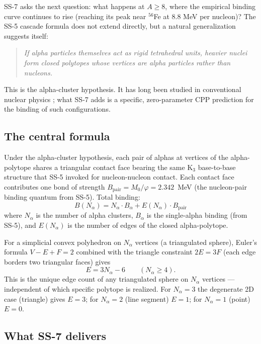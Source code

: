 \documentclass[11pt,letterpaper]{article}
\newcommand{\phig}{\varphi}
\newcommand{\Mzero}{M_0}
\newcommand{\Bpair}{B_{\mathrm{pair}}}
\newcommand{\Balpha}{B_{\alpha}}
\newcommand{\Nalpha}{N_{\alpha}}
\begin{document}
SS-7 asks the next question: what happens at $A \geq 8$, where the empirical binding curve continues to rise (reaching its peak near ${}^{56}$Fe at 8.8 MeV per nucleon)? The SS-5 cascade formula does not extend directly, but a natural generalization suggests itself:

\begin{quote}
\emph{If alpha particles themselves act as rigid tetrahedral units, heavier nuclei form closed polytopes whose vertices are alpha particles rather than nucleons.}
\end{quote}

This is the alpha-cluster hypothesis. It has long been studied in conventional nuclear physics \cite{freer_alpha, horiuchi_alpha}; what SS-7 adds is a specific, zero-parameter CPP prediction for the binding of such configurations.

\subsection{The central formula}

Under the alpha-cluster hypothesis, each pair of alphas at vertices of the alpha-polytope shares a triangular contact face bearing the same K$_3$ base-to-base structure that SS-5 invoked for nucleon-nucleon contact. Each contact face contributes one bond of strength $\Bpair = \Mzero/\phig = 2.342$~MeV (the nucleon-pair binding quantum from SS-5). Total binding:
\begin{equation}
\boxed{B(\Nalpha) = \Nalpha \cdot \Balpha + E(\Nalpha) \cdot \Bpair}
\label{eq:SS7}
\end{equation}
where $\Nalpha$ is the number of alpha clusters, $\Balpha$ is the single-alpha binding (from SS-5), and $E(\Nalpha)$ is the number of edges of the closed alpha-polytope.

For a simplicial convex polyhedron on $\Nalpha$ vertices (a triangulated sphere), Euler's formula $V - E + F = 2$ combined with the triangle constraint $2E = 3F$ (each edge borders two triangular faces) gives
\begin{equation}
E = 3\Nalpha - 6 \qquad (\Nalpha \geq 4).
\label{eq:edges}
\end{equation}
This is the unique edge count of any triangulated sphere on $\Nalpha$ vertices --- independent of which specific polytope is realized. For $\Nalpha = 3$ the degenerate 2D case (triangle) gives $E = 3$; for $\Nalpha = 2$ (line segment) $E = 1$; for $\Nalpha = 1$ (point) $E = 0$.

\subsection{What SS-7 delivers}
\end{document}
